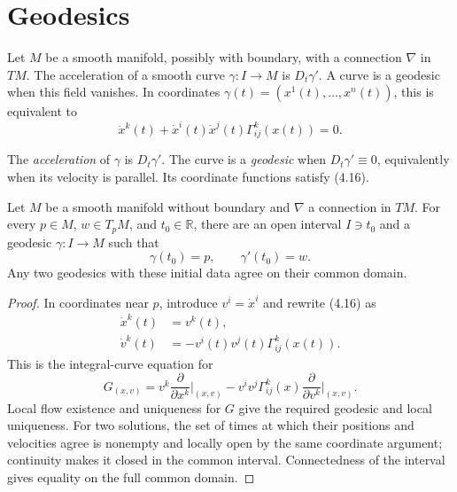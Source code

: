 \section{Geodesics}

Let $M$ be a smooth manifold, possibly with boundary, with a connection $\nabla$
in $TM$. The acceleration of a smooth curve $\gamma\colon I\to M$ is
$D_t\gamma'$. A curve is a geodesic when this field vanishes. In coordinates
$\gamma(t)=(x^1(t),\ldots,x^n(t))$, this is equivalent to
\begin{equation}
\ddot x^k(t)+\dot x^i(t)\dot x^j(t)\Gamma^k_{ij}(x(t))=0. \tag{4.16}
\end{equation}

\begin{definition}[Geodesic]
\label{def:geodesic}
\leanok
The \emph{acceleration} of $\gamma$ is $D_t\gamma'$. The curve is a
\emph{geodesic} when $D_t\gamma'\equiv0$, equivalently when its velocity is
parallel. Its coordinate functions satisfy (4.16).
\end{definition}

\begin{theorem}
\label{thm:geodesic-existence-uniqueness}
\leanok
Let $M$ be a smooth manifold without boundary and $\nabla$ a connection in
$TM$. For every $p\in M$, $w\in T_pM$, and $t_0\in\mathbb R$, there are an open
interval $I\ni t_0$ and a geodesic $\gamma\colon I\to M$ such that
\[
\gamma(t_0)=p,
\qquad \gamma'(t_0)=w.
\]
Any two geodesics with these initial data agree on their common domain.
\end{theorem}

\begin{proof}
\leanok
\sketch In coordinates near $p$, introduce $v^i=\dot x^i$ and rewrite (4.16) as
\begin{align}
\dot x^k(t)&=v^k(t),\\
\dot v^k(t)&=-v^i(t)v^j(t)\Gamma^k_{ij}(x(t)). \tag{4.17}
\end{align}
This is the integral-curve equation for
\begin{equation}
G_{(x,v)}=v^k\frac{\partial}{\partial x^k}\bigg|_{(x,v)}
-v^iv^j\Gamma^k_{ij}(x)\frac{\partial}{\partial v^k}\bigg|_{(x,v)}. \tag{4.18}
\end{equation}
Local flow existence and uniqueness for $G$ give the required geodesic and local
uniqueness. For two solutions, the set of times at which their positions and
velocities agree is nonempty and locally open by the same coordinate argument;
continuity makes it closed in the common interval. Connectedness of the interval
gives equality on the full common domain.
\end{proof}

